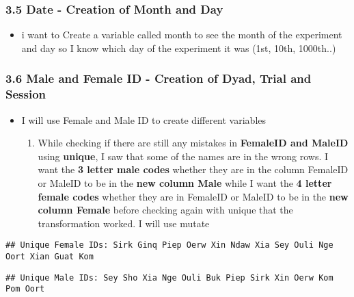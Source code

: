 \documentclass[
]{article}
\providecommand{\tightlist}{%
  \setlength{\itemsep}{0pt}\setlength{\parskip}{0pt}}
\begin{document}
\hypertarget{date---creation-of-month-and-day}{%
\subsubsection{3.5 Date - Creation of Month and
Day}\label{date---creation-of-month-and-day}}

\begin{itemize}
\tightlist
\item
  i want to Create a variable called month to see the month of the
  experiment and day so I know which day of the experiment it was (1st,
  10th, 1000th..)
\end{itemize}

\hypertarget{male-and-female-id---creation-of-dyad-trial-and-session}{%
\subsubsection{3.6 Male and Female ID - Creation of Dyad, Trial and
Session}\label{male-and-female-id---creation-of-dyad-trial-and-session}}

\begin{itemize}
\tightlist
\item
  I will use Female and Male ID to create different variables

  \begin{enumerate}
  \def\labelenumi{\arabic{enumi}.}
  \tightlist
  \item
    While checking if there are still any mistakes in \textbf{FemaleID
    and MaleID} using \textbf{unique}, I saw that some of the names are
    in the wrong rows. I want the \textbf{3 letter male codes} whether
    they are in the column FemaleID or MaleID to be in the \textbf{new
    column Male} while I want the \textbf{4 letter female codes} whether
    they are in FemaleID or MaleID to be in the \textbf{new column
    Female} before checking again with unique that the transformation
    worked. I will use mutate
  \end{enumerate}
\end{itemize}

\begin{verbatim}
## Unique Female IDs: Sirk Ginq Piep Oerw Xin Ndaw Xia Sey Ouli Nge Oort Xian Guat Kom
\end{verbatim}

\begin{verbatim}
## Unique Male IDs: Sey Sho Xia Nge Ouli Buk Piep Sirk Xin Oerw Kom Pom Oort
\end{verbatim}
\end{document}

